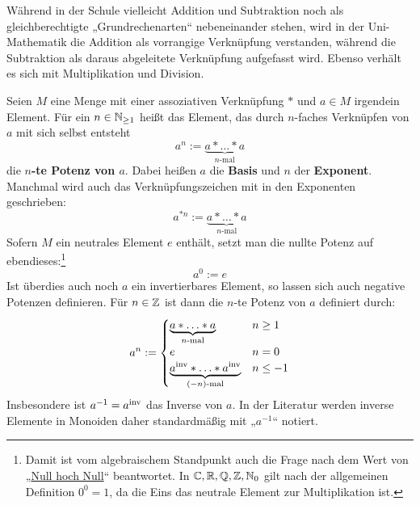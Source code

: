 \begin{bem}
    Während in der Schule vielleicht Addition und Subtraktion noch als gleichberechtigte „Grundrechenarten“ nebeneinander stehen, wird in der Uni-Mathematik die Addition als vorrangige Verknüpfung verstanden, während die Subtraktion als daraus abgeleitete Verknüpfung aufgefasst wird. Ebenso verhält es sich mit Multiplikation und Division.
\end{bem}


\begin{defin}[* Potenzen] \label{def:potenz}  
    Seien $M$ eine Menge mit einer assoziativen Verknüpfung $*$ und $a\in M$ irgendein Element. Für ein $n\in \mathbb N_{\ge 1}$ heißt das Element, das durch $n$-faches Verknüpfen von $a$ mit sich selbst entsteht
    \[ a^n := \underbrace{a * \ldots * a}_{n\text{-mal}} \]
    die \textbf{$n$-te Potenz von $a$}. Dabei heißen $a$ die \textbf{Basis} und $n$ der \textbf{Exponent}. Manchmal wird auch das Verknüpfungszeichen mit in den Exponenten geschrieben:
            \[ a^{*n} := \underbrace{a * \ldots * a}_{n\text{-mal}} \]
    Sofern $M$ ein neutrales Element $e$ enthält, setzt man die nullte Potenz auf ebendieses:\footnote{Damit ist vom algebraischem Standpunkt auch die Frage nach dem Wert von „\href{https://en.wikipedia.org/wiki/Zero_to_the_power_of_zero}{Null hoch Null}“ beantwortet. In $\mathbb C,\mathbb R,\mathbb Q,\mathbb Z,\mathbb N_0$ gilt nach der allgemeinen Definition $0^0=1$, da die Eins das neutrale Element zur Multiplikation ist.}
        \[ a^0 := e \]
    Ist überdies auch noch $a$ ein invertierbares Element, so lassen sich auch negative Potenzen definieren. Für $n\in \mathbb Z$ ist dann die $n$-te Potenz von $a$ definiert durch:
    \begin{align*}
        a^n := \begin{cases}
            \underbrace{a* \ldots * a}_{n\text{-mal}} & n \ge 1 \\
            e & n= 0 \\
            \underbrace{a^{\mathrm{inv}} * \ldots * a^{\mathrm{inv}}}_{(-n)\text{-mal}} & n \le -1
        \end{cases}
    \end{align*}
    Insbesondere ist $a^{-1}=a^{\mathrm{inv}}$ das Inverse von $a$. In der Literatur werden inverse Elemente in Monoiden daher standardmäßig mit „$a^{-1}$“ notiert.
\end{defin}

